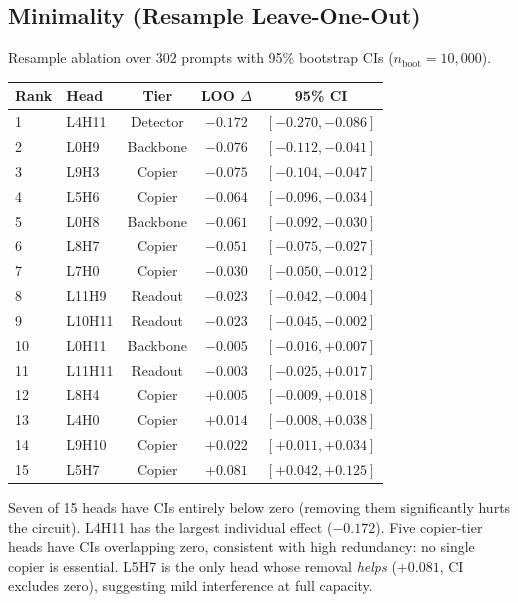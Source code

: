 \documentclass{article}
\begin{document}
\begin{appendices}
\subsection{Minimality (Resample Leave-One-Out)}

Resample ablation over 302 prompts with 95\% bootstrap CIs
($n_{\text{boot}} = 10{,}000$).

\begin{table}[h]
\centering
\begin{tabular}{llccc}
\toprule
\textbf{Rank} & \textbf{Head} & \textbf{Tier} & \textbf{LOO $\Delta$} & \textbf{95\% CI} \\
\midrule
1 & L4H11 & Detector & $-0.172$ & $[-0.270, -0.086]$ \\
2 & L0H9 & Backbone & $-0.076$ & $[-0.112, -0.041]$ \\
3 & L9H3 & Copier & $-0.075$ & $[-0.104, -0.047]$ \\
4 & L5H6 & Copier & $-0.064$ & $[-0.096, -0.034]$ \\
5 & L0H8 & Backbone & $-0.061$ & $[-0.092, -0.030]$ \\
6 & L8H7 & Copier & $-0.051$ & $[-0.075, -0.027]$ \\
7 & L7H0 & Copier & $-0.030$ & $[-0.050, -0.012]$ \\
8 & L11H9 & Readout & $-0.023$ & $[-0.042, -0.004]$ \\
9 & L10H11 & Readout & $-0.023$ & $[-0.045, -0.002]$ \\
10 & L0H11 & Backbone & $-0.005$ & $[-0.016, +0.007]$ \\
11 & L11H11 & Readout & $-0.003$ & $[-0.025, +0.017]$ \\
12 & L8H4 & Copier & $+0.005$ & $[-0.009, +0.018]$ \\
13 & L4H0 & Copier & $+0.014$ & $[-0.008, +0.038]$ \\
14 & L9H10 & Copier & $+0.022$ & $[+0.011, +0.034]$ \\
15 & L5H7 & Copier & $+0.081$ & $[+0.042, +0.125]$ \\
\bottomrule
\end{tabular}
\end{table}

Seven of 15 heads have CIs entirely below zero (removing them
significantly hurts the circuit). L4H11 has the largest individual
effect ($-0.172$). Five copier-tier heads have CIs overlapping zero,
consistent with high redundancy: no single copier is essential.
L5H7 is the only head whose removal \emph{helps} ($+0.081$,
CI excludes zero), suggesting mild interference at full capacity.


\end{appendices}
\end{document}
